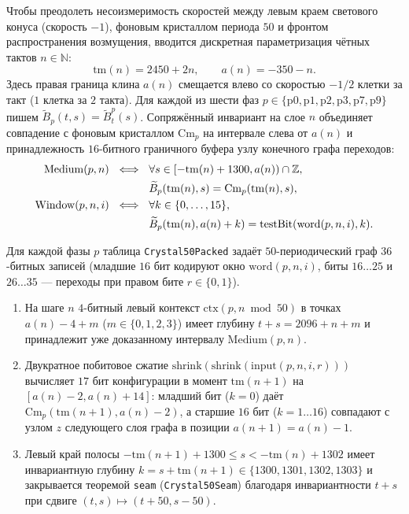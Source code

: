Чтобы преодолеть несоизмеримость скоростей между левым краем светового конуса (скорость $-1$), фоновым кристаллом периода $50$ и фронтом распространения возмущения, вводится дискретная параметризация чётных тактов $n \in \mathbb{N}$:
\begin{equation}
\mathrm{tm}(n) = 2450 + 2n, \qquad a(n) = -350 - n.
\end{equation}
Здесь правая граница клина $a(n)$ смещается влево со скоростью $-1/2$ клетки за такт ($1$ клетка за $2$ такта). Для каждой из шести фаз $p \in \{\mathrm{p0}, \mathrm{p1}, \mathrm{p2}, \mathrm{p3}, \mathrm{p7}, \mathrm{p9}\}$ пишем $\widetilde B_p(t,s)=\widetilde B^p_t(s)$. Сопряжённый инвариант на слое $n$ объединяет совпадение с фоновым кристаллом $\mathrm{Cm}_p$ на интервале слева от $a(n)$ и принадлежность $16$-битного граничного буфера узлу конечного графа переходов:
\begin{align}
\mathrm{Medium}(p,n)\ \iff\ {}&
\forall s\in[-\mathrm{tm}(n)+1300,a(n))\cap\mathbb{Z},\notag\\
&\widetilde B_p(\mathrm{tm}(n),s)=\mathrm{Cm}_p(\mathrm{tm}(n),s), \\
\mathrm{Window}(p,n,i)\ \iff\ {}&
\forall k\in\{0,\dots,15\},\notag\\
&\widetilde B_p(\mathrm{tm}(n),a(n)+k)=\mathrm{testBit}(\mathrm{word}(p,n,i),k).
\end{align}

\begin{lemma}\label{lem:transducer}
Для каждой фазы $p$ таблица \texttt{Crystal50Packed} задаёт $50$-периодический граф $36$-битных записей (младшие $16$ бит кодируют окно $\mathrm{word}(p, n, i)$, биты $16\dots 25$ и $26\dots 35$ — переходы при правом бите $r \in \{0, 1\}$).
\begin{enumerate}[label=(\alph*)]
    \item На шаге $n$ $4$-битный левый контекст $\mathrm{ctx}(p, n \bmod 50)$ в точках $a(n) - 4 + m$ ($m \in \{0, 1, 2, 3\}$) имеет глубину $t + s = 2096 + n + m$ и принадлежит уже доказанному интервалу $\mathrm{Medium}(p, n)$.
    \item Двукратное побитовое сжатие $\mathrm{shrink}(\mathrm{shrink}(\mathrm{input}(p, n, i, r)))$ вычисляет $17$ бит конфигурации в момент $\mathrm{tm}(n+1)$ на $[a(n)-2, a(n)+14]$: младший бит ($k=0$) даёт $\mathrm{Cm}_p(\mathrm{tm}(n+1), a(n) - 2)$, а старшие $16$ бит ($k=1\dots 16$) совпадают с узлом $z$ следующего слоя графа в позиции $a(n+1) = a(n) - 1$.
    \item Левый край полосы $-\mathrm{tm}(n+1) + 1300 \le s < -\mathrm{tm}(n) + 1302$ имеет инвариантную глубину $k = s + \mathrm{tm}(n+1) \in \{1300,1301,1302,1303\}$ и закрывается теоремой \texttt{seam} (\texttt{Crystal50Seam}) благодаря инвариантности $t + s$ при сдвиге $(t, s) \mapsto (t + 50, s - 50)$.
\end{enumerate}
\end{lemma}

